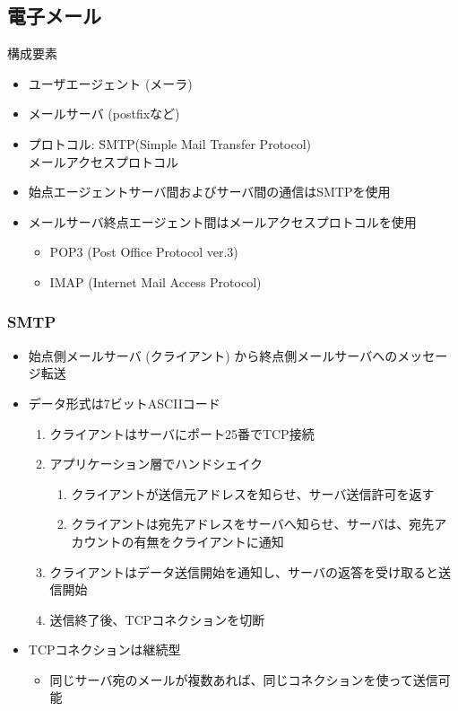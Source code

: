 \newpage
\subsection{電子メール}

構成要素
\begin{itemize}
  \item ユーザエージェント (メーラ)  %
  \item メールサーバ (postfixなど)
  \item \begin{tabbing}
    プロトコル: \=SMTP(Simple Mail Transfer Protocol)\\
    \>メールアクセスプロトコル
  \end{tabbing}
  \item 始点エージェントサーバ間およびサーバ間の通信はSMTPを使用
  \item メールサーバ終点エージェント間はメールアクセスプロトコルを使用
  \begin{itemize}
    \item POP3 (Post Office Protocol ver.3)
    \item IMAP (Internet Mail Access Protocol)
  \end{itemize}
\end{itemize}

\subsubsection{SMTP}

\begin{itemize}
  \item 始点側メールサーバ (クライアント) から終点側メールサーバへのメッセージ転送
  \item データ形式は7ビットASCIIコード
  \begin{enumerate}
    \item クライアントはサーバにポート25番でTCP接続
    \item アプリケーション層でハンドシェイク
    \begin{enumerate}
      \item クライアントが送信元アドレスを知らせ、サーバ送信許可を返す
      \item クライアントは宛先アドレスをサーバへ知らせ、サーバは、宛先アカウントの有無をクライアントに通知
    \end{enumerate}
    \item クライアントはデータ送信開始を通知し、サーバの返答を受け取ると送信開始
    \item 送信終了後、TCPコネクションを切断
  \end{enumerate}
  \item TCPコネクションは継続型
  \begin{itemize}
    \item[] 同じサーバ宛のメールが複数あれば、同じコネクションを使って送信可能
  \end{itemize}
\end{itemize}

